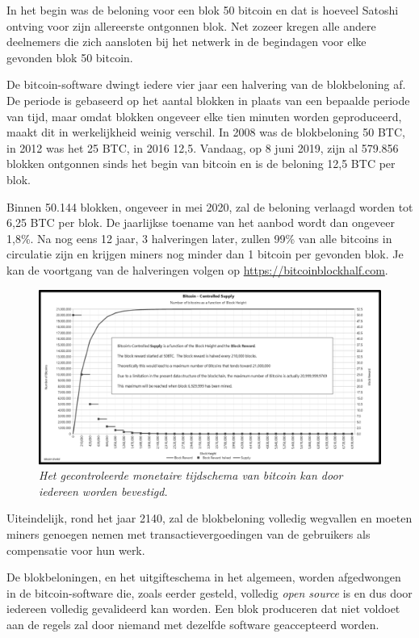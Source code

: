 \documentclass[smalldemyvopaper,11pt,twoside,onecolumn,openright,extrafontsizes]{memoir}
\begin{document}
In het begin was de beloning voor een blok 50 bitcoin en dat is hoeveel Satoshi ontving voor zijn allereerste ontgonnen blok. Net zozeer kregen alle andere deelnemers die zich aansloten bij het netwerk in de begindagen voor elke gevonden blok 50 bitcoin.

De bitcoin-software dwingt iedere vier jaar een halvering van de blokbeloning af. De periode is gebaseerd op het aantal blokken in plaats van een bepaalde periode van tijd, maar omdat blokken ongeveer elke tien minuten worden geproduceerd, maakt dit in werkelijkheid weinig verschil. In 2008 was de blokbeloning 50 BTC, in 2012 was het 25 BTC, in 2016 12,5. Vandaag, op 8 juni 2019, zijn al 579.856 blokken ontgonnen sinds het begin van bitcoin en is de beloning 12,5 BTC per blok.

Binnen 50.144 blokken, ongeveer in mei 2020, zal de beloning verlaagd worden tot 6,25 BTC per blok. De jaarlijkse toename van het aanbod wordt dan ongeveer 1,8\%. Na nog eens 12 jaar, 3 halveringen later, zullen 99\% van alle bitcoins in circulatie zijn en krijgen miners nog minder dan 1 bitcoin per gevonden blok. Je kan de voortgang van de halveringen volgen op \href{https://bitcoinblockhalf.com}{https://bitcoinblockhalf.com}.

\begin{figure}
    \centering
    \includegraphics[width=\textwidth]{images/fig6.png}
    \caption{\footnotesize{\textit{Het gecontroleerde monetaire tijdschema van bitcoin kan door iedereen worden bevestigd.}}}
    \label{fig6}
\end{figure}

Uiteindelijk, rond het jaar 2140, zal de blokbeloning volledig wegvallen en moeten miners genoegen nemen met transactievergoedingen van de gebruikers als compensatie voor hun werk.

De blokbeloningen, en het uitgifteschema in het algemeen, worden afgedwongen in de bitcoin-software die, zoals eerder gesteld, volledig \textit{open source} is en dus door iedereen volledig gevalideerd kan worden. Een blok produceren dat niet voldoet aan de regels zal door niemand met dezelfde software geaccepteerd worden.
\end{document}
